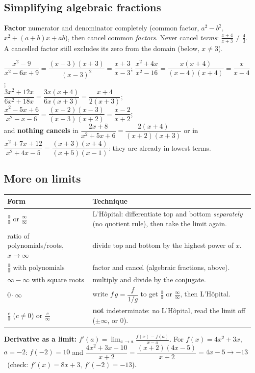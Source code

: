 \documentclass{fkt-notes}
\theoremstyle{definition}
\begin{document}
\subsection*{Simplifying algebraic fractions}
%
\begin{rulepar}
  \textbf{Factor} numerator and denominator completely (common factor,
  $a^2-b^2$, $x^2+(a+b)x+ab$), then cancel common \emph{factors}. Never
  cancel \emph{terms}: $\frac{x+4}{x+3}\neq\frac43$. A cancelled factor
  still excludes its zero from the domain (below, $x\neq3$).
\end{rulepar}
$\dfrac{x^2-9}{x^2-6x+9}=\dfrac{(x-3)(x+3)}{(x-3)^2}=\dfrac{x+3}{x-3}$;
\qquad
$\dfrac{x^2+4x}{x^2-16}=\dfrac{x(x+4)}{(x-4)(x+4)}=\dfrac x{x-4}$;\\[4pt]
$\dfrac{3x^2+12x}{6x^2+18x}=\dfrac{3x(x+4)}{6x(x+3)}=\dfrac{x+4}{2(x+3)}$;
\qquad
$\dfrac{x^2-5x+6}{x^2-x-6}=\dfrac{(x-2)(x-3)}{(x-3)(x+2)}=\dfrac{x-2}{x+2}$;\\[4pt]
and \textbf{nothing cancels} in
$\dfrac{2x+8}{x^2+5x+6}=\dfrac{2(x+4)}{(x+2)(x+3)}$ or in
$\dfrac{x^2+7x+12}{x^2+4x-5}=\dfrac{(x+3)(x+4)}{(x+5)(x-1)}$:
they are already in lowest terms.

\subsection*{More on limits}\label{qg:limits}
%
\begin{rulepar}
  \small\renewcommand{\arraystretch}{1.3}
  \begin{tabular}{@{}p{}p{}@{}}
    \textbf{Form} & \textbf{Technique} \\\hline
    $\frac00$ or $\frac\infty\infty$ & L'H\^opital: differentiate top and bottom \emph{separately} (no quotient rule), then take the limit again. \\
    ratio of polynomials/roots, $x\to\infty$ & divide top and bottom by the highest power of $x$. \\
    $\frac00$ with polynomials & factor and cancel (algebraic fractions, above). \\
    $\infty-\infty$ with square roots & multiply and divide by the conjugate. \\
    $0\cdot\infty$ & write $f\,g=\dfrac f{1/g}$ to get $\frac00$ or $\frac\infty\infty$, then L'H\^opital. \\
    $\frac c0$ ($c\neq0$) or $\frac c\infty$ & \textbf{not} indeterminate: no L'H\^opital, read the limit off ($\pm\infty$, or $0$). \\
  \end{tabular}
\end{rulepar}
\textbf{Derivative as a limit:} $f'(a)=\displaystyle\lim_{x\to a}\frac{f(x)-f(a)}{x-a}$.
For $f(x)=4x^2+3x$, $a=-2$: $f(-2)=10$ and
$\dfrac{4x^2+3x-10}{x+2}=\dfrac{(x+2)(4x-5)}{x+2}=4x-5\to-13$
\ (check: $f'(x)=8x+3$, $f'(-2)=-13$).
\end{document}
